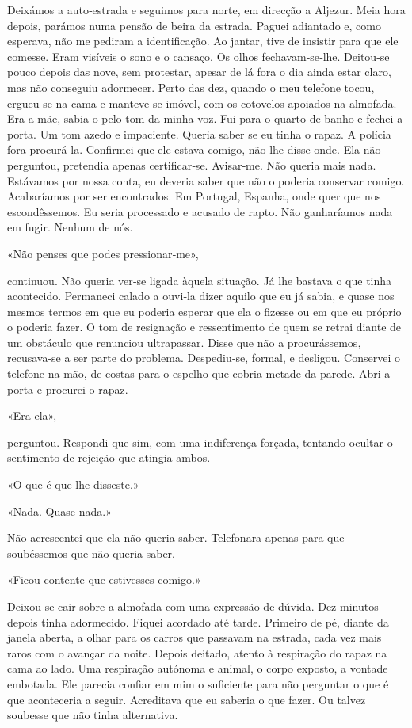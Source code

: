 Deixámos a auto­‑estrada e seguimos para norte, em direcção a Aljezur.
Meia hora depois, parámos numa pensão de beira da estrada. Paguei
adiantado e, como esperava, não me pediram a identificação. Ao jantar,
tive de insistir para que ele comesse. Eram visíveis o sono e o cansaço.
Os olhos fechavam­‑se­‑lhe. Deitou­‑se pouco depois das nove, sem
protestar, apesar de lá fora o dia ainda estar claro, mas não conseguiu
adormecer. Perto das dez, quando o meu telefone tocou, ergueu­‑se na
cama e manteve­‑se imóvel, com os cotovelos apoiados na almofada. Era a
mãe, sabia­‑o pelo tom da minha voz. Fui para o quarto de banho e fechei
a porta. Um tom azedo e impaciente. Queria saber se eu tinha o rapaz. A
polícia fora procurá­‑la. Confirmei que ele estava comigo, não lhe disse
onde. Ela não perguntou, pretendia apenas certificar­‑se. Avisar­‑me.
Não queria mais nada. Estávamos por nossa conta, eu deveria saber que
não o poderia conservar comigo. Acabaríamos por ser encontrados. Em
Portugal, Espanha, onde quer que nos escondêssemos. Eu seria processado
e acusado de rapto. Não ganharíamos nada em fugir. Nenhum de nós.

«Não penses que podes pressionar­‑me»,

continuou. Não queria ver­‑se ligada àquela situação. Já lhe bastava o
que tinha acontecido. Permaneci calado a ouvi­‑la dizer aquilo que eu já
sabia, e quase nos mesmos termos em que eu poderia esperar que ela o
fizesse ou em que eu próprio o poderia fazer. O tom de resignação e
ressentimento de quem se retrai diante de um obstáculo que renunciou
ultrapassar. Disse que não a procurássemos, recusava­‑se a ser parte do
problema. Despediu­‑se, formal, e desligou. Conservei o telefone na mão,
de costas para o espelho que cobria metade da parede. Abri a porta e
procurei o rapaz.

«Era ela»,

perguntou. Respondi que sim, com uma indiferença forçada, tentando
ocultar o sentimento de rejeição que atingia ambos.

«O que é que lhe disseste.»

«Nada. Quase nada.»

Não acrescentei que ela não queria saber. Telefonara apenas para que
soubéssemos que não queria saber.

«Ficou contente que estivesses comigo.»

Deixou­‑se cair sobre a almofada com uma expressão de dúvida. Dez
minutos depois tinha adormecido. Fiquei acordado até tarde. Primeiro de
pé, diante da janela aberta, a olhar para os carros que passavam na
estrada, cada vez mais raros com o avançar da noite. Depois deitado,
atento à respiração do rapaz na cama ao lado. Uma respiração autónoma e
animal, o corpo exposto, a vontade embotada. Ele parecia confiar em mim
o suficiente para não perguntar o que é que aconteceria a seguir.
Acreditava que eu saberia o que fazer. Ou talvez soubesse que não tinha
alternativa.

